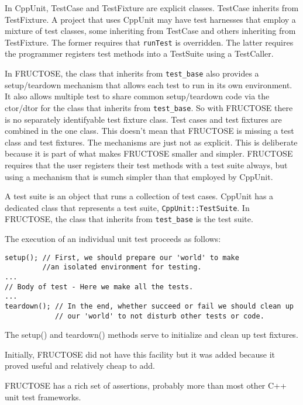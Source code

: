 \documentclass{book}
\begin{document}
In CppUnit, TestCase and TestFixture are explicit classes.
TestCase inherits from TestFixture. A project that uses CppUnit may have test harnesses
that employ a mixture of test classes, some inheriting from TestCase and 
others inheriting from TestFixture.
The former requires that {\tt runTest} is overridden. The latter requires the
programmer registers test methods into a TestSuite using a TestCaller.

In FRUCTOSE, the class that inherits from {\tt test\_base} also provides
a setup/teardown mechanism that allows each test to run in its own environment.
It also allows multiple test to
share common setup/teardown code via the ctor/dtor for the class that
inherits from {\tt test\_base}. So with FRUCTOSE there is no separately 
identifyable test fixture class. Test cases and test fixtures are combined 
in the one class. This doesn't mean that FRUCTOSE is missing a test class 
and test fixtures. The mechanisms are just not as explicit. 
This is deliberate because it is part of what makes FRUCTOSE smaller and 
simpler. FRUCTOSE requires that the user registers
their test methods with a test suite always, but using a mechanism that is
sumch simpler than that employed by CppUnit.


A test suite is an object that runs a collection of test cases.
CppUnit has a dedicated class that represents a test suite, 
{\tt CppUnit::TestSuite}.
In FRUCTOSE, the class that inherits from {\tt test\_base} is the test suite.

The execution of an individual unit test proceeds as follows:

\begin{verbatim}
setup(); // First, we should prepare our 'world' to make 
         //an isolated environment for testing.
...
// Body of test - Here we make all the tests.
...
teardown(); // In the end, whether succeed or fail we should clean up 
            // our 'world' to not disturb other tests or code.
\end{verbatim}

The setup() and teardown() methods serve to initialize and clean up
test fixtures.

Initially, FRUCTOSE did not have this facility but it was added
because it proved useful and relatively cheap to add.


FRUCTOSE has a rich set of assertions, probably more than most other 
C++ unit test frameworks.
\end{document}
